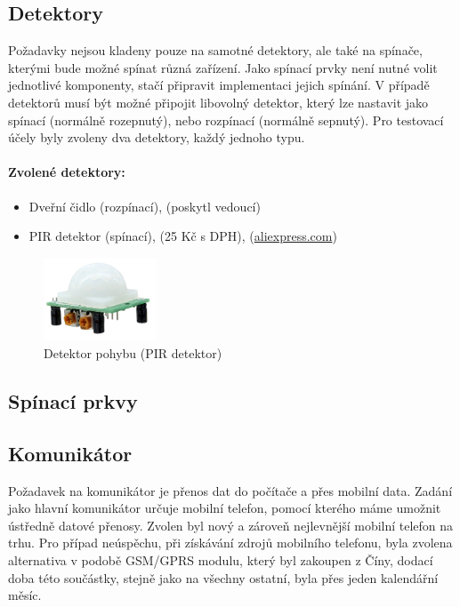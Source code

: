 \documentclass[FM,DP]{tulthesis}  %
\begin{document}
\subsection{Detektory}
Požadavky nejsou kladeny pouze na samotné detektory, ale také na spínače, kterými bude možné spínat různá zařízení. Jako spínací prvky není nutné volit jednotlivé komponenty, stačí připravit implementaci jejich spínání. V případě detektorů musí být možné připojit libovolný detektor, který lze nastavit jako spínací (normálně rozepnutý), nebo rozpínací (normálně sepnutý). Pro testovací účely byly zvoleny dva detektory, každý jednoho typu.

\paragraph{Zvolené detektory:}
\begin{itemize}
\item Dveřní čidlo (rozpínací), (poskytl vedoucí)
\item PIR detektor (spínací), (25 Kč s DPH), (\url{aliexpress.com})
\end{itemize} 

\begin{figure}[H]
\begin{center}
\includegraphics[width=0.3\textwidth]{images/PIR.jpg}
\caption{Detektor pohybu (PIR detektor)}
\label{image}
\end{center}
\end{figure}

\subsection{Spínací prkvy}

\subsection{Komunikátor}
Požadavek na komunikátor je přenos dat do počítače a přes mobilní data. Zadání jako hlavní komunikátor určuje mobilní telefon, pomocí kterého máme umožnit ústředně datové přenosy. Zvolen byl nový a zároveň nejlevnější mobilní telefon na trhu. Pro případ neúspěchu, při získávání zdrojů mobilního telefonu, byla zvolena alternativa v podobě GSM/GPRS modulu, který byl zakoupen z Číny, dodací doba této součástky, stejně jako na všechny ostatní, byla přes jeden kalendářní měsíc.
\end{document}
